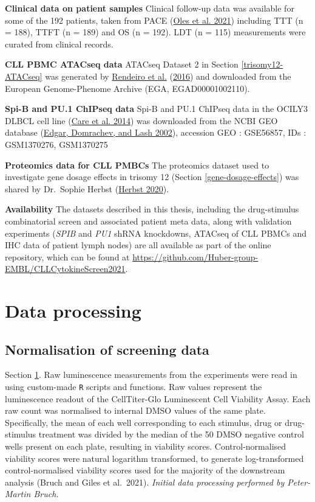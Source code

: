 \documentclass[11pt, a4paper, twosided]{book}
\begin{document}
\textbf{Clinical data on patient samples} Clinical follow-up data was available for some of the 192 patients, taken from PACE (\protect\hyperlink{ref-R-BloodCancerMultiOmics2017}{Oles et al. 2021}) including TTT (n = 188), TTFT (n = 189) and OS (n = 192). LDT (n = 115) measurements were curated from clinical records.

\textbf{CLL PBMC ATACseq data} ATACseq Dataset 2 in Section \ref{trisomy12-ATACseq} was generated by \protect\hyperlink{ref-Rendeiro2016}{Rendeiro et al.} (\protect\hyperlink{ref-Rendeiro2016}{2016}) and downloaded from the European Genome-Phenome Archive (EGA, EGAD00001002110).

\textbf{Spi-B and PU.1 ChIPseq data}
Spi-B and PU.1 ChIPseq data in the OCILY3 DLBCL cell line (\protect\hyperlink{ref-Care2014}{Care et al. 2014}) was downloaded from the NCBI GEO database (\protect\hyperlink{ref-Edgar2002}{Edgar, Domrachev, and Lash 2002}), accession GEO : GSE56857, IDs : GSM1370276, GSM1370275

\textbf{Proteomics data for CLL PMBCs}
The proteomics dataset used to investigate gene dosage effects in trisomy 12 (Section \ref{gene-dosage-effects}) was shared by Dr.~Sophie Herbst (\protect\hyperlink{ref-HerbstThesis}{Herbst 2020}).

\textbf{Availability}
The datasets described in this thesis, including the drug-stimulus combinatorial screen and associated patient meta data, along with validation experiments (\emph{SPIB} and \emph{PU1} shRNA knockdowns, ATACseq of CLL PBMCs and IHC data of patient lymph nodes) are all available as part of the online repository, which can be found at \url{https://github.com/Huber-group-EMBL/CLLCytokineScreen2021}.

\hypertarget{data-processing}{%
\section{Data processing}\label{data-processing}}

\hypertarget{normalisation-of-screening-data}{%
\subsection{Normalisation of screening data}\label{normalisation-of-screening-data}}

Section \ref{data-processing}. Raw luminescence measurements from the experiments were read in using custom-made \texttt{R} scripts and functions. Raw values represent the luminescence readout of the CellTiter-Glo Luminescent Cell Viability Assay. Each raw count was normalised to internal DMSO values of the same plate. Specifically, the mean of each well corresponding to each stimulus, drug or drug-stimulus treatment was divided by the median of the 50 DMSO negative control wells present on each plate, resulting in viability scores. Control-normalised viability scores were natural logarithm transformed, to generate log-transformed control-normalised viability scores used for the majority of the downstream analysis (Bruch and Giles et al.~2021). \emph{Initial data processing performed by Peter-Martin Bruch.}
\end{document}
